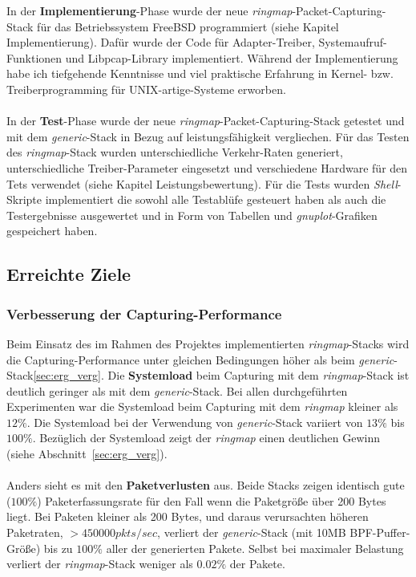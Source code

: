 {%
In der \textbf{Implementierung}-Phase wurde der neue
\emph{ringmap}-Packet-Capturing-Stack für das Betriebssystem FreeBSD
programmiert (siehe Kapitel Implementierung). Dafür wurde der Code für
Adapter-Treiber, Systemaufruf-Funktionen und Libpcap-Library implementiert.
Während der Implementierung  habe ich tiefgehende Kenntnisse und viel
praktische Erfahrung in  Kernel- bzw. Treiberprogramming für
UNIX-artige-Systeme erworben.  \\\\
%
In der \textbf{Test}-Phase wurde der neue \emph{ringmap}-Packet-Capturing-Stack
getestet und mit dem \emph{generic}-Stack in Bezug auf leistungsfähigkeit
vergliechen. Für das Testen des \emph{ringmap}-Stack wurden unterschiedliche
Verkehr-Raten generiert, unterschiedliche Treiber-Parameter eingesetzt und
verschiedene Hardware für den Tets verwendet (siehe Kapitel
Leistungsbewertung). Für die Tests wurden \emph{Shell}-Skripte implementiert
die sowohl alle Testablüfe gesteuert haben als auch die Testergebnisse
ausgewertet und in Form von Tabellen und \emph{gnuplot}-Grafiken gespeichert
haben. 
}
\subsection{Erreichte Ziele}

\subsubsection{Verbesserung der Capturing-Performance}
Beim Einsatz des im Rahmen des Projektes implementierten \emph{ringmap}-Stacks
wird die Capturing-Performance unter gleichen Bedingungen höher als beim
\emph{generic}-Stack\ref{sec:erg_verg}. Die \textbf{Systemload} beim Capturing
mit dem \emph{ringmap}-Stack ist deutlich geringer als mit dem
\emph{generic}-Stack.  Bei allen durchgeführten Experimenten war die Systemload
beim Capturing mit dem \emph{ringmap} kleiner als $12\%$. Die Systemload bei
der Verwendung von \emph{generic}-Stack variiert von $13\%$ bis $100\%$.
Bezüglich der Systemload zeigt der \emph{ringmap} einen deutlichen Gewinn (siehe Abschnitt~\ref{sec:erg_verg}).\\\\
%
Anders sieht es mit den \textbf{Paketverlusten} aus. Beide Stacks zeigen
identisch gute ($100\%$) Paketerfassungsrate für den Fall wenn die Paketgröße
über 200 Bytes liegt. Bei Paketen kleiner als 200 Bytes, und daraus
verursachten höheren Paketraten, $> 450000 pkts/sec$, verliert der
\emph{generic}-Stack (mit 10MB BPF-Puffer-Größe) bis zu $100\%$ aller der
generierten Pakete. Selbst bei maximaler Belastung verliert der \emph{ringmap}-Stack 
weniger als $0.02\%$ der Pakete.
%
